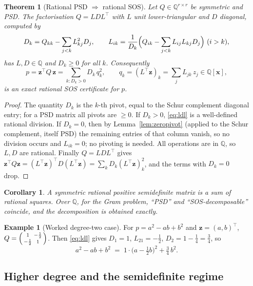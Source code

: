 \documentclass[11pt]{article}
\theoremstyle{definition}
\newtheorem{example}[definition]{Example}
\theoremstyle{plain}
\newtheorem{theorem}[definition]{Theorem}
\newtheorem{corollary}[definition]{Corollary}
\newcommand{\Q}{\mathbb{Q}}
\newcommand{\x}{\mathbf{x}}
\newcommand{\z}{\mathbf{z}}
\newcommand{\transpose}{^{\!\top}}
\begin{document}
\begin{theorem}[Rational PSD $\Rightarrow$ rational SOS]\label{thm:ldl}
Let $Q \in \Q^{r\times r}$ be symmetric and PSD. The factorisation $Q = L D
L\transpose$ with $L$ unit lower-triangular and $D$ diagonal, computed by
\begin{equation}\label{eq:ldl}
  D_k = Q_{kk} - \sum_{j<k} L_{kj}^2 D_j,
  \qquad
  L_{ik} = \frac{1}{D_k}\Bigl(Q_{ik} - \sum_{j<k} L_{ij} L_{kj} D_j\Bigr)\ (i>k),
\end{equation}
has $L, D \in \Q$ and $D_k \ge 0$ for all $k$. Consequently
\[
  p = \z\transpose Q\, \z
    = \sum_{k : D_k > 0} D_k\, q_k^2,
  \qquad q_k = (L\transpose \z)_k = \sum_{j} L_{jk}\, z_j \in \Q[\x],
\]
is an exact rational SOS certificate for $p$.
\end{theorem}
\begin{proof}
The quantity $D_k$ is the $k$-th pivot, equal to the Schur complement diagonal
entry; for a PSD matrix all pivots are $\ge 0$. If $D_k > 0$, \eqref{eq:ldl} is a
well-defined rational division. If $D_k = 0$, then by Lemma~\ref{lem:zeropivot}
(applied to the Schur complement, itself PSD) the remaining entries of that
column vanish, so no division occurs and $L_{ik} = 0$; no pivoting is needed. All
operations are in $\Q$, so $L, D$ are rational. Finally $Q = L D L\transpose$
gives
$\z\transpose Q \z = (L\transpose\z)\transpose D (L\transpose\z)
= \sum_k D_k (L\transpose \z)_k^2$, and the terms with $D_k = 0$ drop.
\end{proof}

\begin{corollary}
A symmetric rational positive semidefinite matrix is a sum of rational squares.
Over $\Q$, for the Gram problem, ``PSD'' and ``SOS-decomposable'' coincide, and
the decomposition is obtained \emph{exactly}.
\end{corollary}

\begin{example}[Worked degree-two case]
For $p = a^2 - ab + b^2$ and $\z = (a,b)\transpose$,
$Q = \begin{psmallmatrix} 1 & -\frac12 \\ -\frac12 & 1 \end{psmallmatrix}$.
Then \eqref{eq:ldl} gives $D_1 = 1$, $L_{21} = -\tfrac12$, $D_2 = 1 - \tfrac14 =
\tfrac34$, so
\[
  a^2 - ab + b^2 \;=\; 1\cdot\bigl(a - \tfrac12 b\bigr)^2 + \tfrac34\, b^2 .
\]
\end{example}

\subsection{Higher degree and the semidefinite regime}
\end{document}
